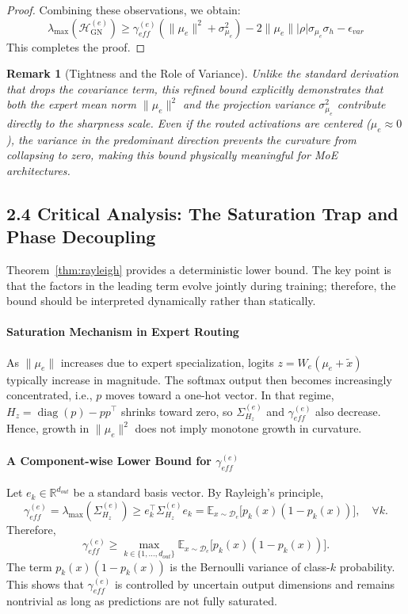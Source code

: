 \documentclass[11pt]{article}
\newtheorem{remark}{Remark}
\begin{document}
\begin{proof}
Combining these observations, we obtain:
\begin{equation}
    \lambda_{\max}(\mathcal{H}_{\mathrm{GN}}^{(e)}) \ge \gamma_{eff}^{(e)}(\|\mu_e\|^2 + \sigma_{\mu_e}^2) - 2\|\mu_e\| |\rho| \sigma_{\mu_e} \sigma_h - \epsilon_{var}
\end{equation}
This completes the proof.
\end{proof}

\begin{remark}[Tightness and the Role of Variance]
Unlike the standard derivation that drops the covariance term, this refined bound explicitly demonstrates that both the expert mean norm $\|\mu_e\|^2$ and the projection variance $\sigma_{\mu_e}^2$ contribute directly to the sharpness scale. Even if the routed activations are centered ($\mu_e \approx 0$), the variance in the predominant direction prevents the curvature from collapsing to zero, making this bound physically meaningful for MoE architectures.
\end{remark}

\subsection*{2.4 Critical Analysis: The Saturation Trap and Phase Decoupling}

Theorem~\ref{thm:rayleigh} provides a deterministic lower bound. The key point is that the factors in the leading term evolve jointly during training; therefore, the bound should be interpreted dynamically rather than statically.

\paragraph{Saturation Mechanism in Expert Routing}
As $\|\mu_e\|$ increases due to expert specialization, logits $z = W_e(\mu_e + \tilde{x})$ typically increase in magnitude. The softmax output then becomes increasingly concentrated, i.e., $p$ moves toward a one-hot vector. In that regime, $H_z = \operatorname{diag}(p) - pp^\top$ shrinks toward zero, so $\Sigma_{H_z}^{(e)}$ and $\gamma_{eff}^{(e)}$ also decrease. Hence, growth in $\|\mu_e\|^2$ does not imply monotone growth in curvature.

\paragraph{A Component-wise Lower Bound for $\gamma_{eff}^{(e)}$}
Let $e_k \in \mathbb{R}^{d_{out}}$ be a standard basis vector. By Rayleigh's principle,
\[
\gamma_{eff}^{(e)} = \lambda_{\max}(\Sigma_{H_z}^{(e)})
\ge e_k^\top \Sigma_{H_z}^{(e)} e_k
= \mathbb{E}_{x \sim \mathcal{D}_e}\bigl[p_k(x)(1-p_k(x))\bigr], \quad \forall k.
\]
Therefore,
\[
\gamma_{eff}^{(e)}
\ge \max_{k \in \{1,\dots,d_{out}\}} \mathbb{E}_{x \sim \mathcal{D}_e}\bigl[p_k(x)(1-p_k(x))\bigr].
\]
The term $p_k(x)(1-p_k(x))$ is the Bernoulli variance of class-$k$ probability. This shows that $\gamma_{eff}^{(e)}$ is controlled by uncertain output dimensions and remains nontrivial as long as predictions are not fully saturated.
\end{document}
